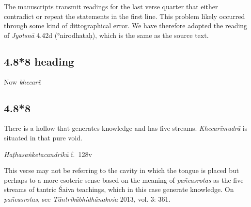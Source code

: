 \begin{ekdosis}
\begin{philcomm}[hp04_008_7]
The manuscripts transmit readings for the last verse quarter that either contradict or repeat the statements in the first line. This problem likely occurred through some kind of dittographical error. We have therefore adopted the reading of \emph{Jyotsnā} 4.42d (°nirodhataḥ), which is the same as the source text. 
\end{philcomm}

\subsection*{4.8*8 heading}
\begin{translation}[hp04_008_8a]
Now \emph{khecarī}:
\end{translation}


\subsection*{4.8*8}
\begin{translation}[hp04_008_8]
There is a hollow that generates knowledge and has five streams. \emph{Khecarīmudrā} is situated in that pure void.
\end{translation}
%

\begin{testimonia}[hp04_008_8]
\emph{Haṭhasaṅketacandrikā} f.~128v
\begin{versinnote}
\end{versinnote}
\end{testimonia}

\begin{philcomm}[hp04_008_8]
This verse may not be referring to the cavity in which the tongue is placed but perhaps to a more esoteric sense based on the meaning of \textit{pañcasrotas} as the five streams of tantric Śaiva teachings, which in this case generate knowledge. On \textit{pañcasrotas}, see \emph{Tāntrikābhidhānakośa} 2013, vol. 3: 361.
\end{philcomm}


\end{ekdosis}
